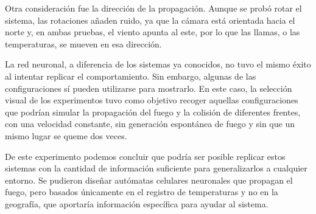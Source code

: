 	Otra consideración fue la dirección de la propagación. Aunque se probó rotar el sistema, las rotaciones añaden ruido, ya que la cámara está orientada hacia el norte y, en ambas pruebas, el viento apunta al este, por lo que las llamas, o las temperaturas, se mueven en esa dirección.

	La red neuronal, a diferencia de los sistemas ya conocidos, no tuvo el mismo éxito al intentar replicar el comportamiento. Sin embargo, algunas de las configuraciones sí pueden utilizarse para mostrarlo. En este caso, la selección visual de los experimentos tuvo como objetivo recoger aquellas configuraciones que podrían simular la propagación del fuego y la colisión de diferentes frentes, con una velocidad constante, sin generación espontánea de fuego y sin que un mismo lugar se queme dos veces.

	De este experimento podemos concluir que podría ser posible replicar estos sistemas con la cantidad de información suficiente para generalizarlos a cualquier entorno. Se pudieron diseñar autómatas celulares neuronales que propagan el fuego, pero basados únicamente en el registro de temperaturas y no en la geografía, que aportaría información específica para ayudar al sistema.
	


